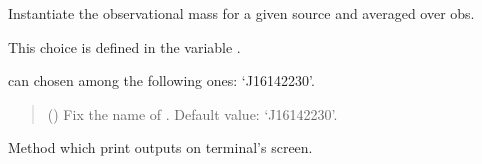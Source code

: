\documentclass[letterpaper,10pt,english]{sphinxmanual}
\begin{document}
\begin{fulllineitems}
\label{\detokenize{source/api/setup_astro_masses:nucleardatapy.setup_astro_masses.SetupAstroMassesAverage}}
\pysigstartsignatures
\pysiglinewithargsret
{}
{}
{}
\pysigstopsignatures
\sphinxAtStartPar
Instantiate the observational mass for a given source and averaged over obs.

\sphinxAtStartPar
This choice is defined in the variable .

\sphinxAtStartPar
{} can chosen among the following ones: ‘J1614\textendash{}2230’.
\begin{quote}\begin{description}
\sphinxAtStartPar
{} (\sphinxstyleliteralemphasis{\sphinxupquote{, }}) \textendash{} Fix the name of . Default value: ‘J1614\textendash{}2230’.

\end{description}\end{quote}

\sphinxAtStartPar
{}

\begin{fulllineitems}
\label{\detokenize{source/api/setup_astro_masses:nucleardatapy.setup_astro_masses.SetupAstroMassesAverage.print_outputs}}
\pysigstartsignatures
\pysiglinewithargsret
{}
{}
{}
\pysigstopsignatures
\sphinxAtStartPar
Method which print outputs on terminal’s screen.

\end{fulllineitems}


\end{fulllineitems}

\end{document}
